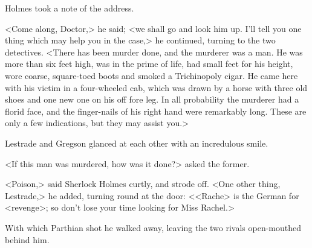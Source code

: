 Holmes took a note of the address.

<Come along, Doctor,> he said; <we shall go and look him up. I'll tell you one thing which may help you in the case,> he continued, turning to the two detectives. <There has been murder done, and the murderer was a man. He was more than six feet high, was in the prime of life, had small feet for his height, wore coarse, square-toed boots and smoked a Trichinopoly cigar. He came here with his victim in a four-wheeled cab, which was drawn by a horse with three old shoes and one new one on his off fore leg. In all probability the murderer had a florid face, and the finger-nails of his right hand were remarkably long. These are only a few indications, but they may assist you.>

Lestrade and Gregson glanced at each other with an incredulous smile.

<If this man was murdered, how was it done?> asked the former.

<Poison,> said Sherlock Holmes curtly, and strode off. <One other thing, Lestrade,> he added, turning round at the door: <<Rache> is the German for <revenge>; so don't lose your time looking for Miss Rachel.>

With which Parthian shot he walked away, leaving the two rivals open-mouthed behind him.